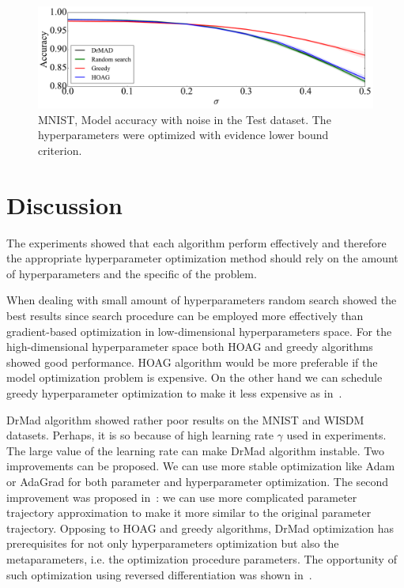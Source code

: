 \documentclass[smallcondensed]{svjour3}
\begin{document}
    \begin{figure}

    \includegraphics[width=\linewidth]{plots/Fig_noise.pdf}

    \caption{MNIST, Model accuracy with noise in the Test dataset. The hyperparameters were optimized with evidence lower bound criterion.}
    \label{fig:noise}
    \end{figure}





\section{Discussion}
\label{discussion}
The experiments showed that each algorithm perform effectively and therefore the appropriate hyperparameter optimization method should rely on the amount of hyperparameters and the specific of the problem. 

When dealing with small amount of hyperparameters random search showed the best results since search procedure can be employed more effectively than gradient-based optimization in low-dimensional hyperparameters space. For the high-dimensional hyperparameter space both  HOAG and greedy algorithms showed good performance. 
HOAG algorithm would be more preferable if the model optimization problem is expensive. On the other hand we can schedule greedy hyperparameter optimization to make it less expensive as in~\cite{hyper_greed}. 

DrMad algorithm showed rather poor results on the MNIST and WISDM datasets. Perhaps, it is so because of high learning rate $\gamma$ used in experiments. The large value of the learning rate can make DrMad algorithm instable. Two improvements can be proposed. We can use more stable optimization like Adam or AdaGrad for both parameter and hyperparameter optimization. The second improvement was proposed in~\cite{hyper_mad}: we can use more complicated parameter trajectory approximation to make it more similar to the original parameter trajectory. Opposing to HOAG and greedy algorithms, DrMad optimization has prerequisites for not only hyperparameters optimization but also the metaparameters, i.e. the optimization procedure parameters. The opportunity of such optimization using reversed differentiation was shown in~\cite{hyper_mad}. 
\end{document}
